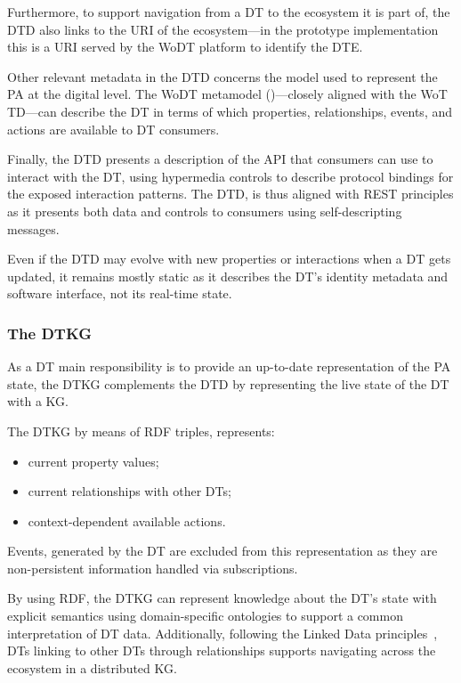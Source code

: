 Furthermore, to support navigation from a \ac{DT} to the ecosystem it is part of, the \ac{DTD} also links to the \ac{URI} of the ecosystem---in the prototype implementation this is a URI served by the \ac{WoDT} platform to identify the \ac{DTE}.

Other relevant metadata in the \ac{DTD} concerns the model used to represent the \ac{PA} at the digital level.
%
The \ac{WoDT} metamodel ()---closely aligned with the  \ac{WoT} \ac{TD}---can describe the \ac{DT} in terms of which properties, relationships, events, and actions are available to \ac{DT} consumers. 

Finally, the \ac{DTD} presents a description of the \ac{API} that consumers can use to interact with the \ac{DT}, using hypermedia controls to describe protocol bindings for the exposed interaction patterns.
%
The \ac{DTD}, is thus aligned with \ac{REST} principles as it presents both data and controls to consumers using self-descripting messages.

Even if the \ac{DTD} may evolve with new properties or interactions when a \ac{DT} gets updated, it remains mostly static as it describes the \ac{DT}'s identity metadata and software interface, not its real-time state.

\subsubsection{The \acl{DTKG}}

As a \ac{DT} main responsibility is to provide an up-to-date representation of the \ac{PA} state, the \ac{DTKG} complements the \ac{DTD} by representing the live state of the \ac{DT} with a \ac{KG}.

The \ac{DTKG} by means of \ac{RDF} triples, represents:
\begin{itemize}
    \item current property values;
    \item current relationships with other \acp{DT};
    \item context-dependent available actions.
\end{itemize}
Events, generated by the \ac{DT} are excluded from this representation as they are non-persistent information handled via subscriptions.

By using \ac{RDF}, the \ac{DTKG} can represent knowledge about the \ac{DT}'s state with explicit semantics using domain-specific ontologies to support a common interpretation of \ac{DT} data.
Additionally, following the Linked Data principles~\cite{Bizer_Heath_Berners-Lee_2023}, \acp{DT} linking to other \acp{DT} through relationships supports navigating across the ecosystem in a distributed \ac{KG}.

